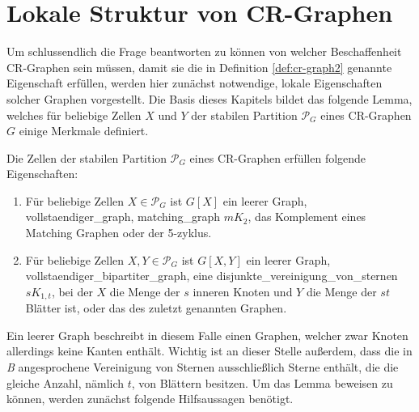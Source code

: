 \section{Lokale Struktur von CR-Graphen}
\label{sec/struktur_lokal}


Um schlussendlich die Frage beantworten zu können von welcher Beschaffenheit CR-Graphen sein müssen, damit sie die in Definition \ref{def:cr-graph2} genannte Eigenschaft erfüllen, werden hier zunächst notwendige, lokale Eigenschaften solcher Graphen vorgestellt.
Die Basis dieses Kapitels bildet das folgende Lemma, welches für beliebige Zellen $X$ und $Y$ der stabilen Partition $\mathcal{P}_G$ eines CR-Graphen $G$ einige Merkmale definiert.

\begin{Lemma}
	Die Zellen der stabilen Partition $\mathcal{P}_G$ eines CR-Graphen erfüllen folgende Eigenschaften:
	
	\begin{enumerate}[label=(\Alph*)]
		\item Für beliebige Zellen $X\in \mathcal{P}_G$ ist $G[X]$ ein leerer Graph, \gls{vollstaendiger_graph}, \gls{matching_graph} $mK_2$, das Komplement eines Matching Graphen oder der 5-\gls{zyklus}.
		\item Für beliebige Zellen $X,Y\in \mathcal{P}_G$ ist $G[X,Y]$ ein leerer Graph, \gls{vollstaendiger_bipartiter_graph}, eine \gls{disjunkte_vereinigung_von_sternen} $sK_{1,t}$, bei der $X$ die Menge der $s$ inneren Knoten und $Y$ die Menge der $st$ Blätter ist, oder das  des zuletzt genannten Graphen.
	\end{enumerate}
	\label{lemma:lokal}
\end{Lemma}

Ein leerer Graph beschreibt in diesem Falle einen Graphen, welcher zwar Knoten allerdings keine Kanten enthält.
Wichtig ist an dieser Stelle außerdem, dass die in \emph{B} angesprochene Vereinigung von Sternen ausschließlich Sterne enthält, die die gleiche Anzahl, nämlich $t$, von Blättern besitzen.
Um das Lemma beweisen zu können, werden zunächst folgende Hilfsaussagen benötigt.

